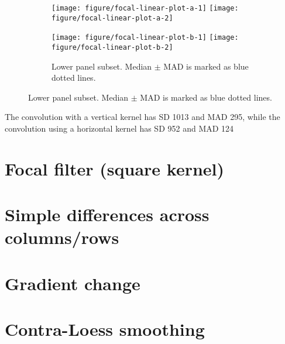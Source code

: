 \documentclass[10pt,fleqn]{article}\usepackage[]{graphicx}\usepackage[]{color}
\newenvironment{knitrout}{}{} %
\begin{document}
\begin{figure}[!ht]
\begin{subfigure}[b]{0.49\textwidth}
\begin{knitrout}
{\centering \texttt{[image: figure/focal-linear-plot-a-1]} 
\texttt{[image: figure/focal-linear-plot-a-2]} 

}



\end{knitrout}
\end{subfigure}
%
\begin{subfigure}[b]{0.49\textwidth}
\caption{Lower panel subset. Median $\pm$ MAD is marked as blue dotted lines.}
\begin{knitrout}\footnotesize
{}\color{fgcolor}

{\centering \texttt{[image: figure/focal-linear-plot-b-1]} 
\texttt{[image: figure/focal-linear-plot-b-2]} 

}



\end{knitrout}
\end{subfigure}
\end{figure}

The convolution with a vertical kernel has SD 1013 and MAD 295, while the convolution using a horizontal kernel has SD 952 and MAD 124


\section*{Focal filter (square kernel)}

\section*{Simple differences across columns/rows}


\section*{Gradient change}

\section*{Contra-Loess smoothing}


\end{document}
